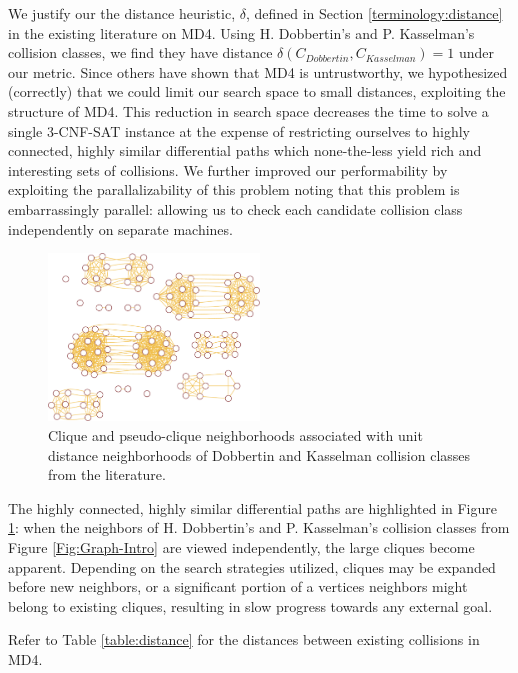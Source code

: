 \documentclass[conference]{IEEEtran}
\begin{document}
We justify our the distance heuristic, $\delta$, defined in Section
\ref{terminology:distance} in the existing literature on MD4.  Using
H. Dobbertin's \cite{Dobbertin1998} and P. Kasselman's \cite{KasselmanMD4}
collision classes, we find they have distance $\delta(C_{Dobbertin}, C_{Kasselman}) = 1$
under our metric. Since others have shown that MD4 is untrustworthy,
we hypothesized (correctly) that we could
limit our search space to small distances, exploiting the structure of MD4. This
reduction in search space decreases the time to solve a single 3-CNF-SAT
instance at the expense of restricting ourselves to highly connected, highly
similar differential paths which none-the-less yield rich and
interesting sets of collisions. We further improved our performability
by exploiting the parallalizability of this problem
noting that this problem is embarrassingly parallel: allowing us to
check each
candidate collision class independently on separate machines.

\begin{figure}
\begin{center}
\includegraphics[width=0.5\textwidth]{Figs/graph-clique-crop.pdf}
\caption{Clique and pseudo-clique neighborhoods associated with
  unit distance neighborhoods of Dobbertin and Kasselman collision
  classes from the literature.}
\label{Fig:Graph-Clique}
\end{center}
\end{figure}

The highly connected, highly similar differential paths are highlighted in
Figure \ref{Fig:Graph-Clique}: when the neighbors of H. Dobbertin's and
P. Kasselman's collision classes from Figure \ref{Fig:Graph-Intro} are viewed
independently, the large cliques become apparent. Depending on the search
strategies utilized, cliques may be expanded before new neighbors, or a
significant portion of a vertices neighbors might belong to existing cliques,
resulting in slow progress towards any external goal.

Refer to Table \ref{table:distance} for the distances between existing
collisions in MD4.
\end{document}
